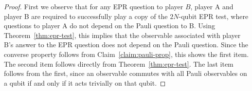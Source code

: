\begin{proof}
First we observe that for any EPR question to player $B$, player A and player B are required to successfully play a copy of the $2N$-qubit EPR test, where questions to player A do not depend on the Pauli question to B. Using Theorem~\ref{thm:epr-test}, this implies that the observable associated with player B's answer to the EPR question does not depend on the Pauli question. Since the converse property follows from Claim~\ref{claim:pauli-prop}, this shows the first item. The second item follows directly from Theorem~\ref{thm:epr-test}. The last item follows from the first, since an observable commutes with all Pauli observables on a qubit if and only if it acts trivially on that qubit.   
\end{proof}

%


